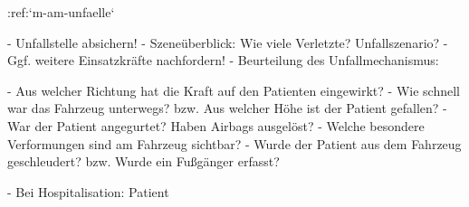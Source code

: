 :ref:`m-am-unfaelle`
\begin{itemize}
  -   Unfallstelle absichern!
  -   Szeneüberblick: Wie viele Verletzte? Unfallszenario?
  -   Ggf. weitere Einsatzkräfte nachfordern!
  -   Beurteilung des Unfallmechanismus:
  \begin{itemize}
    -   Aus welcher Richtung hat die Kraft auf den Patienten eingewirkt?
    -   Wie schnell war das Fahrzeug unterwegs? bzw. Aus
    welcher Höhe ist der Patient gefallen?
    -   War der Patient angegurtet? Haben Airbags
    ausgelöst?
    -   Welche besondere Verformungen sind am Fahrzeug
    sichtbar?
    -   Wurde der Patient aus dem Fahrzeug geschleudert?
    bzw. Wurde ein Fußgänger erfasst?
  \end{itemize}
  -   Bei Hospitalisation: Patient 
\end{itemize}